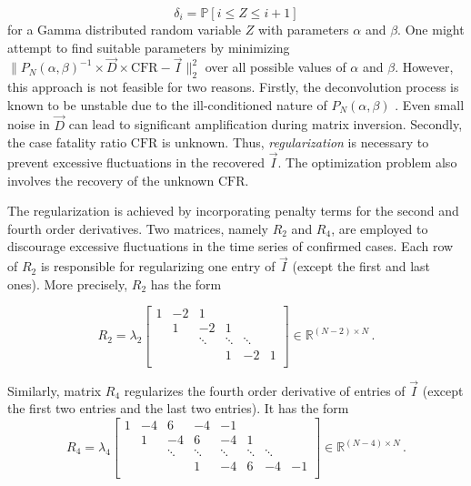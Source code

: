 \documentclass[sn-mathphys,Numbered]{sn-jnl}
\begin{document}
$$
  \delta_{i} = \mathbb{P}[ i \leq Z \leq i+1]
  $$
for a Gamma distributed random variable $Z$ with parameters $\alpha$
and $\beta$. One might attempt to find suitable parameters by minimizing $\lVert P_{N}(\alpha, \beta)^{-1} \times \vec{D} \times \mathrm{CFR} -\vec{I}\rVert^2_2$ over all possible values of $\alpha$ and $\beta$. However, this approach is not feasible for two reasons. Firstly, the deconvolution process is known to be unstable due to the ill-conditioned nature of $P_{N}(\alpha, \beta)$ \cite{deconvolution, deconvolution2}. Even small noise in $\vec{D}$ can lead to significant amplification during matrix inversion. Secondly, the case fatality ratio $\text{CFR}$ is unknown. Thus, \textit{regularization} is necessary to prevent excessive fluctuations in the recovered $\vec{I}$. The optimization problem also involves the recovery of the unknown $\text{CFR}$.

The regularization is achieved by incorporating penalty terms for the second and fourth order derivatives. Two matrices, namely $R_{2}$ and $R_{4}$, are employed to discourage excessive fluctuations in the time series of confirmed cases. Each row of $R_{2}$ is responsible for regularizing one entry of $\vec{I}$ (except the first and last ones). More precisely, $R_{2}$ has the form

\[
        R_{2} = \lambda_{2}
        \begin{bmatrix}
            1 & -2      & 1 \\
               & 1     & -2   &1   & \\
               &        & \ddots & \ddots &\ddots\\
               & & &   1     & -2     & 1\\
        \end{bmatrix} \in \mathbb{R}^{(N-2) \times N}\,.
\]

Similarly, matrix $R_{4}$ regularizes the fourth order derivative of
entries of $\vec{I}$ (except the first two entries and the last two entries). It has the form
\[
        R_{4} = \lambda_{4}
        \begin{bmatrix}
            1 & -4 & 6 &-4      & -1  \\
               & 1     & -4   &6 &-4&1   & \\
               &        & \ddots & \ddots & \ddots &\ddots &\ddots \\
               &     &   &   1     & -4 &6 &-4     & -1\\
        \end{bmatrix} \in \mathbb{R}^{(N-4) \times N}\,.
\]
\end{document}
